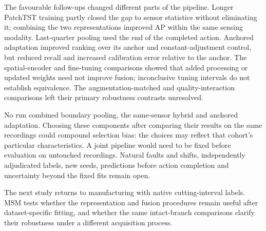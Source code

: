 The favourable follow-ups changed different parts of the pipeline. Longer PatchTST
training partly closed the gap to sensor statistics without eliminating it; combining
the two representations improved AP within the same sensing modality. Last-quarter
pooling used the end of the completed action. Anchored adaptation improved ranking over
its anchor and constant-adjustment control, but reduced recall and increased calibration
error relative to the anchor. The spatial-encoder and fine-tuning comparisons showed
that added processing or updated weights need not improve fusion; inconclusive tuning
intervals do not establish equivalence. The augmentation-matched and quality-interaction
comparisons left their primary robustness contrasts unresolved.

No run combined boundary pooling, the same-sensor hybrid and anchored adaptation.
Choosing these components after comparing their results on the same recordings could
compound selection bias: the choices may reflect that cohort's particular
characteristics. A joint pipeline would need to be fixed before evaluation on untouched
recordings. Natural faults and shifts, independently adjudicated labels, new seeds,
predictions before action completion and uncertainty beyond the fixed fits remain
open.

The next study returns to manufacturing with native cutting-interval labels. MSM tests
whether the representation and fusion procedures remain useful after dataset-specific
fitting, and whether the same intact-branch comparisons clarify their robustness under
a different acquisition process.
